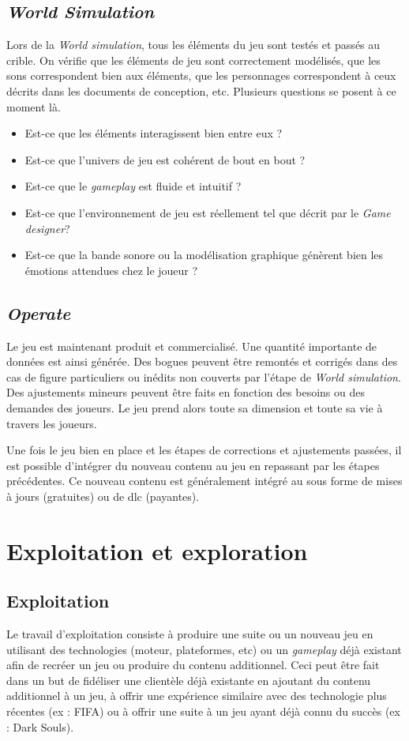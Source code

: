 \subsection{\emph{World Simulation}}
Lors de la \emph{World simulation}, tous les éléments du jeu sont testés et passés au crible. On vérifie que les éléments de jeu sont correctement modélisés, que les sons correspondent bien aux éléments, que les personnages correspondent à ceux décrits dans les documents de conception, etc. Plusieurs questions se posent à ce moment là. 
\begin{itemize}
    \item Est-ce que les éléments interagissent bien entre eux ?
    \item Est-ce que l'univers de jeu est cohérent de bout en bout ?
    \item Est-ce que le \emph{gameplay} est fluide et intuitif ?
    \item Est-ce que l'environnement de jeu est réellement tel que décrit par le \emph{Game designer}?
    \item Est-ce que la bande sonore ou la modélisation graphique génèrent bien les émotions attendues chez le joueur ?
\end{itemize}


\subsection{\emph{Operate}}
Le jeu est maintenant produit et commercialisé. Une quantité importante de données est ainsi générée. Des bogues peuvent être remontés et corrigés dans des cas de figure particuliers ou inédits non couverts par l'étape de \emph{World simulation}. Des ajustements mineurs peuvent être faits en fonction des besoins ou des demandes des joueurs. Le jeu prend alors toute sa dimension et toute sa vie à travers les joueurs.

Une fois le jeu bien en place et les étapes de corrections et ajustements passées, il est possible d'intégrer du nouveau contenu au jeu en repassant par les étapes précédentes. Ce nouveau contenu est généralement intégré au sous forme de mises à jours (gratuites) ou de \gls{dlc} (payantes).



\section{Exploitation et exploration}
\subsection{Exploitation}
Le travail d'exploitation consiste à produire une suite ou un nouveau jeu en utilisant des technologies (moteur, plateformes, etc) ou un \emph{gameplay} déjà existant afin de recréer un jeu ou produire du contenu additionnel. Ceci peut être fait dans un but de fidéliser une clientèle déjà existante en ajoutant du contenu additionnel à un jeu, à offrir une expérience similaire avec des technologie plus récentes (ex : FIFA) ou à offrir une suite à un jeu ayant déjà connu du succès (ex : Dark Souls).

